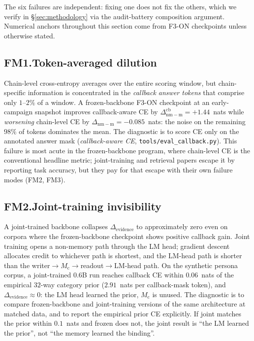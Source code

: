 \documentclass{article}
\newcommand{\Mc}{M_{\mathrm{c}}}
\newcommand{\dnm}{\Delta_{\mathrm{nm-m}}}
\newcommand{\elift}{\Delta_{\mathrm{evidence}}}
\begin{document}
The six failures are independent: fixing one does not fix the
others, which we verify in \S\ref{sec:methodology} via the
audit-battery composition argument.  Numerical anchors throughout
this section come from F3-ON checkpoints unless otherwise stated.

\subsection{FM1.\enspace Token-averaged dilution}
\label{sec:fm1}

Chain-level cross-entropy averages over the entire scoring window,
but chain-specific information is concentrated in the
\emph{callback answer tokens} that comprise only $1$--$2\%$ of a
window.  A frozen-backbone F3-ON checkpoint at an early-campaign
snapshot improves callback-aware CE by $\dnm^{\mathrm{cb}} = +1.44$~nats
while \emph{worsening} chain-level CE by $\dnm = -0.085$~nats: the
noise on the remaining $98\%$ of tokens dominates the mean.  The
diagnostic is to score CE only on the annotated answer mask
(\emph{callback-aware CE}, \texttt{tools/eval\_callback.py}).  This
failure is most acute in the frozen-backbone program, where
chain-level CE is the conventional headline metric; joint-training
and retrieval papers escape it by reporting task accuracy, but they
pay for that escape with their own failure modes (FM2, FM3).

\subsection{FM2.\enspace Joint-training invisibility}
\label{sec:fm2}

A joint-trained backbone collapses $\elift$ to approximately zero
even on corpora where the frozen-backbone checkpoint shows positive
callback gain.  Joint training opens a non-memory path through the
LM head; gradient descent allocates credit to whichever path is
shortest, and the LM-head path is shorter than the
writer$\to\Mc\to$readout$\to$LM-head path.  On the synthetic persona
corpus, a joint-trained 0.6B run reaches callback CE within
$0.06$~nats of the empirical $32$-way category prior ($2.91$~nats
per callback-mask token), and $\elift \approx 0$: the LM head learned
the prior, $\Mc$ is unused.  The diagnostic is to compare
frozen-backbone and joint-training versions of the same architecture
at matched data, and to report the empirical prior CE explicitly.
If joint matches the prior within $0.1$~nats and frozen does not,
the joint result is ``the LM learned the prior'', not
``the memory learned the binding''.
\end{document}
